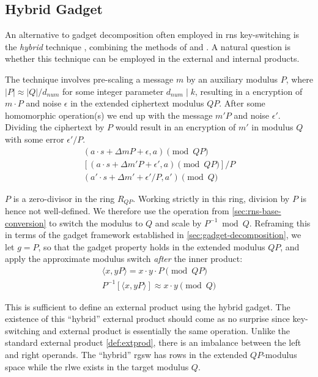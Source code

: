 \subsection{Hybrid Gadget} %
\label{sec:results:hybrid}
An alternative to gadget decomposition often employed in \gls{rns} key-switching is the \textit{hybrid} technique \cite{cryptoeprint:2019/688, cryptoeprint:2021/204}, combining the methods of \cite{cryptoeprint:2011/344} and \cite{cryptoeprint:2012/099}. 
A natural question is whether this technique can be employed in the external and internal products.

The technique involves pre-scaling a message $m$ by an auxiliary modulus $P$, where $|P| \approx |Q|/d_{num}$ for some integer parameter $d_{num} \;|\; k$, resulting in a encryption of $m\cdot P$ and noise $\epsilon$ in the extended ciphertext modulus $QP$. After some homomorphic operation(s) we end up with the message $m'P$ and noise $\epsilon'$. Dividing the ciphertext by $P$ would result in an encryption of $m'$ in modulus $Q$ with some error $\epsilon'/P$.
\begin{gather*}
    (a\cdot s + \Delta m P + \epsilon, a) \pmod{QP} \\
    \left[(a\cdot s + \Delta m' P + \epsilon', a) \pmod{QP}\right] /P \\
    (a'\cdot s + \Delta m' + \epsilon'/P, a') \pmod{Q}
\end{gather*}

$P$ is a zero-divisor in the ring $R_{QP}$. Working strictly in this ring, division by $P$ is hence not well-defined. We therefore use the  operation from \cref{sec:rns-base-conversion} to switch the modulus to $Q$ and scale by $P^{-1} \bmod Q$. Reframing this in terms of the gadget framework established in \cref{sec:gadget-decomposition}, we let $g = P$, so that the gadget property holds in the extended modulus $QP$, and apply the approximate modulus switch \textit{after} the inner product:
\begin{gather*}
    \langle x, yP\rangle = x\cdot y \cdot P \pmod{QP} \\
    P^{-1}\left[\langle x, yP\rangle\right] \approx x\cdot y \pmod{Q}
\end{gather*}

This is sufficient to define an external product using the hybrid gadget. {The existence of this ``hybrid'' external product should come as no surprise since key-switching and external product is essentially the same operation.} Unlike the standard external product \eqref{def:extprod}, there is an imbalance between the left and right operands. The ``hybrid'' \gls{rgsw} has rows in the extended $QP$-modulus space while the \gls{rlwe} exists in the target modulus $Q$.

